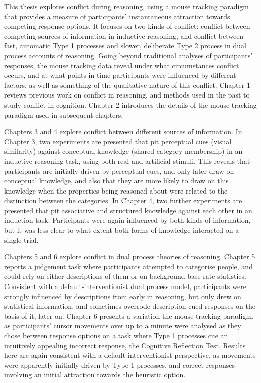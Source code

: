 
This thesis explores conflict during reasoning,
using a mouse tracking paradigm that provides a measure of
participants' instantaneous attraction
towards competing response options.
It focuses on two kinds of conflict:
conflict between competing sources of information in inductive reasoning,
and conflict between fast, automatic Type 1 processes
and slower, deliberate Type 2 process in dual process accounts of reasoning.
Going beyond traditional analyses of participants' responses,
the mouse tracking data reveal
under what circumstances conflict occurs,
and at what points in time participants were influenced by different factors,
as well as something of the qualitative nature of this conflict.
Chapter 1 reviews previous work on conflict in reasoning,
and methods used in the past to study conflict in cognition.
Chapter 2 introduces the details of the mouse tracking paradigm used in subsequent chapters.

Chapters 3 and 4 explore conflict between different sources of information.
In Chapter 3, two experiments are presented
that pit perceptual cues (visual similarity)
against conceptual knowledge (shared category membership)
in an inductive reasoning task,
using both real and artificial stimuli.
This reveals that participants are initially driven by perceptual cues,
and only later draw on conceptual knowledge,
and also that they are more likely
to draw on this knowledge when the properties being reasoned about
were related to the distinction between the categories.
In Chapter 4, two further experiments are presented
that pit associative and structured knowledge
against each other in an induction task.
Participants were again influenced by both kinds of information,
but it was less clear to what extent
both forms of knowledge interacted on a single trial.

Chapters 5 and 6 explore conflict in dual process theories of reasoning.
Chapter 5 reports a judgement task
where participants attempted to categorise people,
and could rely on either descriptions of them
or on background base rate statistics.
Consistent with a default-interventionist dual process model,
participants were strongly influenced by descriptions from early in reasoning,
but only drew on statistical information,
and sometimes overrode description-cued responses on the basis of it, later on.
Chapter 6 presents a variation the mouse tracking paradigm,
as participants' cursor movements over up to a minute
were analysed as they chose between response options on
a task where Type 1 processes cue an intuitively appealing incorrect response,
the Cognitive Reflection Test.
Results here are again consistent with a default-interventionist perspective,
as movements were apparently initially driven by Type 1 processes,
and correct responses involving an initial attraction towards the heuristic option.

